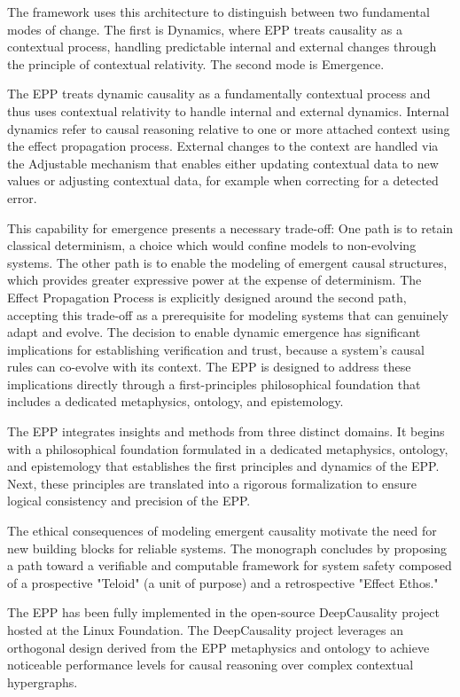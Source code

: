 The framework uses this architecture to distinguish between two fundamental modes of change. 
The first is Dynamics, where EPP treats causality as a contextual process, handling predictable internal and external changes through the principle of contextual relativity. 
The second mode is Emergence.

The EPP treats dynamic causality as a fundamentally contextual process and thus uses contextual relativity to handle internal and external dynamics.
Internal dynamics refer to causal reasoning relative to one or more attached context using the effect propagation process.
External changes to the context are handled via the Adjustable mechanism that enables either updating contextual data to new values or adjusting contextual data, 
for example when correcting for a detected error.

This capability for emergence presents a necessary trade-off: One path is to retain classical determinism, a choice which would confine models to non-evolving systems. 
The other path is to enable the modeling of emergent causal structures, which provides greater expressive power at the expense of determinism. 
The Effect Propagation Process is explicitly designed around the second path, accepting this trade-off as a prerequisite for modeling systems that can genuinely adapt and evolve.
The decision to enable dynamic emergence has significant implications for establishing verification and trust, because a system’s causal rules can co-evolve with its context. 
The EPP is designed to address these implications directly through a first-principles philosophical foundation that includes a dedicated metaphysics, ontology, and epistemology. 

The EPP integrates insights and methods from three distinct domains. It begins with a philosophical foundation formulated 
in a dedicated metaphysics, ontology, and epistemology that establishes the first principles and dynamics of the EPP. 
Next, these principles are translated into a rigorous formalization to ensure logical consistency and precision of the EPP. 

The ethical consequences of modeling emergent causality motivate the need for new building blocks for reliable systems. 
The monograph concludes by proposing a path toward a verifiable and computable framework for system safety composed 
of a prospective "Teloid" (a unit of purpose) and a retrospective "Effect Ethos."

The EPP has been fully implemented in the open-source DeepCausality project hosted at the Linux Foundation. 
The DeepCausality project leverages an orthogonal design derived from the EPP metaphysics and ontology to achieve noticeable performance 
levels for causal reasoning over complex contextual hypergraphs. 

\newpage
